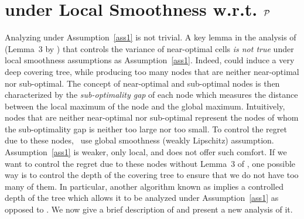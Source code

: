 \section{\HCT{} under Local Smoothness w.r.t. \texorpdfstring{$\mathcal{P}$}{}}\label{sec:gpo.hct}

Analyzing \HOO under Assumption~\ref{ass1} is not trivial. A key lemma in the analysis of \HOO  (Lemma~3 by \citealt{bubeck2011pure}) that controls the variance of near-optimal cells \emph{is not true} under local smoothness assumptions as Assumption~\ref{ass1}. Indeed, \HOO could induce a very deep covering tree,  while producing too many nodes that are neither near-optimal nor sub-optimal. The concept of near-optimal and sub-optimal nodes is then characterized by the \emph{sub-optimality gap} of each node which measures the distance between the local maximum of the node and the global maximum. Intuitively, nodes that are neither near-optimal nor sub-optimal represent the nodes of whom the sub-optimality gap is neither too large nor too small. To control the regret due to these nodes,~\cite{bubeck2011pure} use global smoothness (weakly Lipschitz) assumption. Assumption~\ref{ass1} is weaker, only local, and does not offer such comfort. If we want to control the regret due to these nodes without Lemma~3 of \citet{bubeck2011pure}, one possible way is to control the depth of the covering tree to ensure that we do not have too many of them. In particular, another algorithm known as \HCT \citep{azar2014online} implies a controlled depth of the tree which allows it to be analyzed under Assumption~\ref{ass1} as opposed to \HOO. We now give a brief description of \HCT and present a new analysis of it.

